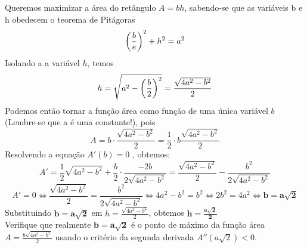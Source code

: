 \cleardoublepage\documentclass[../main.tex]{subfiles}
\begin{document}
Queremos maximizar a área do retângulo $A = bh$, sabendo-se que as variáveis b e h obedecem o 
teorema de Pitágoras $$\left(\frac{b}{e}\right)^2+h^2=a^2$$
Isolando a a variável $h$, temos
$$h=\sqrt{a^2-\left(\frac{b}{2}\right)^2}=\frac{\sqrt{4a^2-b^2}}{2}$$
Podemos então tornar a função área como função de uma única variável $b$ (Lembre-se que a é uma constante!), pois 
$$A=b\cdot\frac{\sqrt{4a^2-b^2}}{2}=\frac{1}{2}\cdot b\frac{\sqrt{4a^2-b^2}}{2} $$
Resolvendo a equação $A'( b) = 0$ , obtemos: 
$$A'=\frac{1}{2}\sqrt{4a^2-b^2}+\frac{b}{2}\cdot\frac{-2b}{2\sqrt{4a^2-b^2}}=\frac{\sqrt{4a^2-b^2}}{2}-\frac{b^2}{2\sqrt{4a^2-b^2}}$$
$$A'=0\Leftrightarrow\frac{\sqrt{4a^2-b^2}}{2}=\frac{b^2}{2\sqrt{4a^2-b^2}}\Leftrightarrow 4a^2-b^2=b^2\Leftrightarrow 2b^2=4a^2\Leftrightarrow \boldsymbol{b=a\sqrt{2} }$$
Substituindo $\boldsymbol{b=a\sqrt{2} } $ em $h=\frac{\sqrt{4a^2-b^2}}{2}$, obtemos $\boldsymbol{h=\frac{a\sqrt{2}}{2}}$\\
Verifique que realmente $\boldsymbol{b=a\sqrt{2} } $ é o ponto de máximo da função área $A=\frac{b\sqrt{4a^2- b^2}}{2}$ usando  o critério da segunda derivada $A''(a\sqrt{2})<0$.
\end{document}
